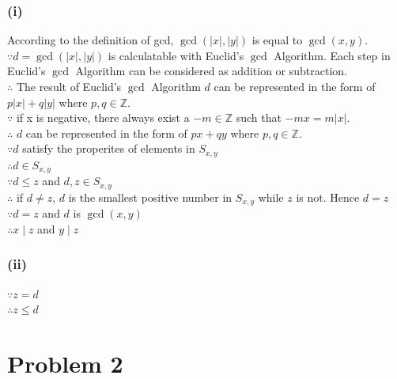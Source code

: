 \documentclass{article} %
\begin{document}
\subsubsection*{(i)}
According to the definition of gcd, $\gcd(\vert x\vert,\vert y\vert)$ is equal to $\gcd(x,y).$\\
$\because d = \gcd(\vert x\vert,\vert y\vert)$ is calculatable with Euclid's $\gcd$ Algorithm. Each step in Euclid's $\gcd$ Algorithm can be considered as addition or subtraction.\\
$\therefore$ The result of Euclid's $\gcd$ Algorithm $d$ can be represented in the form of $p\vert x\vert+q\vert y\vert$ where $p,q \in \mathbb{Z}$.\\
$\because$ if x is negative, there always exist a $-m\in \mathbb{Z}$ such that $-mx = m\vert x\vert$.\\
$\therefore$ $d$ can be represented in the form of $px+qy$ where $p,q \in \mathbb{Z}$.\\
$\because d$ satisfy the properites of elements in $ S_{x,y}$\\
$\therefore d\in S_{x,y}$\\
$\because d\leq z$ and $d,z\in S_{x,y}$\\
$\therefore$ if $d \neq z$, $d$ is the smallest positive number in $S_{x,y}$ while $z$ is not. Hence $d=z$\\
$\because d=z$ and $d$ is $\gcd(x,y)$\\
$\therefore x\mid z$ and $y\mid z$\\
\subsubsection*{(ii)}
$\because z=d$\\
$\therefore z\leq d$\\

\section*{Problem 2}
\end{document}

